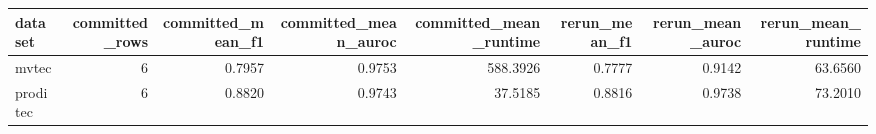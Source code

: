 \begin{tabular}{lrrrrrrr}
\toprule
 dataset &  committed\_rows &  committed\_mean\_f1 &  committed\_mean\_auroc &  committed\_mean\_runtime &  rerun\_mean\_f1 &  rerun\_mean\_auroc &  rerun\_mean\_runtime \\
\midrule
   mvtec &               6 &             0.7957 &                0.9753 &                588.3926 &         0.7777 &            0.9142 &             63.6560 \\
proditec &               6 &             0.8820 &                0.9743 &                 37.5185 &         0.8816 &            0.9738 &             73.2010 \\
\bottomrule
\end{tabular}
